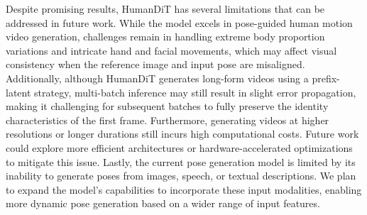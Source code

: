 Despite promising results, HumanDiT has several limitations that can be addressed in future work. While the model excels in pose-guided human motion video generation, challenges remain in handling extreme body proportion variations and intricate hand and facial movements, which may affect visual consistency when the reference image and input pose are misaligned. Additionally, although HumanDiT generates long-form videos using a prefix-latent strategy, multi-batch inference may still result in slight error propagation, making it challenging for subsequent batches to fully preserve the identity characteristics of the first frame. Furthermore, generating videos at higher resolutions or longer durations still incurs high computational costs. Future work could explore more efficient architectures or hardware-accelerated optimizations to mitigate this issue. Lastly, the current pose generation model is limited by its inability to generate poses from images, speech, or textual descriptions. We plan to expand the model’s capabilities to incorporate these input modalities, enabling more dynamic pose generation based on a wider range of input features.